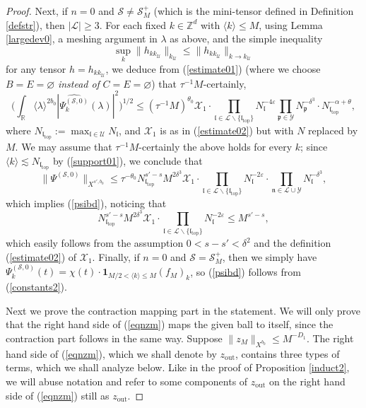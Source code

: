 \documentclass[11 pt,reqno]{amsart}
\theoremstyle{definition}
\theoremstyle{remark}
\numberwithin{equation}{section}
\newcommand{\Sc}{\mathcal{S}}
\newcommand{\Lc}{\mathcal{L}}
\newcommand{\Uc}{\mathcal{U}}
\newcommand{\Xc}{\mathcal{X}}
\newcommand{\Yc}{\mathcal{Y}}
\newcommand{\Rb}{\mathbb{R}}
\newcommand{\Zb}{\mathbb{Z}}
\newcommand{\pf}{\mathfrak{p}}
\newcommand{\nf}{\mathfrak{n}}
\newcommand{\lf}{\mathfrak{l}}
\begin{document}
{\begin{proof}
Next, if $n=0$ and $\Sc\neq\Sc_M^+$ (which is the mini-tensor defined in Definition \ref{defstr}), then $|\Lc|\geq 3$. For each fixed $k\in\Zb^d$ with $\langle k\rangle \leq M$, using Lemma \ref{largedev0}, a meshing argument in $\lambda$ as above, and the simple inequality
\[\sup_k\|h_{kk_\Uc}\|_{k_\Uc}\leq\|h_{kk_\Uc}\|_{k\to k_\Uc}\] for any tensor $h=h_{kk_\Uc}$, we deduce from (\ref{estimate01}) (where we choose $B=E=\varnothing$ \emph{instead of} $C=E=\varnothing$) that $\tau^{-1}M$-certainly,
\[\bigg(\int_{\Rb}\langle\lambda\rangle^{2b_0}|\widehat{\Psi_k^{(\Sc,0)}}(\lambda)|^2\bigg)^{1/2}\leq(\tau^{-1}M)^{\theta_0}\Xc_1\cdot\prod_{\lf\in\Lc\backslash\{\lf_{\mathrm{top}}\}}N_\lf^{-4\varepsilon}\prod_{\pf\in\Yc}N_\pf^{-\delta^3}\cdot N_{\lf_{\mathrm{top}}}^{-\alpha+\theta},\] where $N_{\lf_{\mathrm{top}}}:=\max_{\lf\in\Uc}N_\lf$, and $\Xc_1$ is as in (\ref{estimate02}) but with $N$ replaced by $M$. We may assume that $\tau^{-1}M$-certainly the above holds for every $k$; since $\langle k\rangle\lesssim N_{\lf_{\mathrm{top}}}$ by (\ref{support01}), we conclude that
\[\|\Psi^{(\Sc,0)}\|_{X^{s',b_0}}\leq\tau^{-\theta_0}N_{\lf_{\mathrm{top}}}^{s'-s}M^{2\delta^3}\Xc_1\cdot\prod_{\lf\in\Lc\backslash\{\lf_{\mathrm{top}}\}}N_\lf^{-2\varepsilon}\cdot\prod_{\nf\in\Lc\cup\Yc}N_{\lf}^{-\delta^3},\] which implies (\ref{psibd}), noticing that
\[N_{\lf_{\mathrm{top}}}^{s'-s}M^{2\delta^3}\Xc_1\cdot\prod_{\lf\in\Lc\backslash\{\lf_{\mathrm{top}}\}}N_\lf^{-2\varepsilon}\leq M^{s'-s},\] which easily follows from the assumption $0<s-s'<\delta^2$ and the definition (\ref{estimate02}) of $\Xc_1$. Finally, if $n=0$ and $\Sc=\Sc_M^+$, then we simply have $\Psi_k^{(\Sc,0)}(t)=\chi(t)\cdot\mathbf{1}_{M/2<\langle k\rangle\leq M}(f_M)_k$, so (\ref{psibd}) follows from (\ref{constants2}).

Next we prove the contraction mapping part in the statement. We will only prove that the right hand side of (\ref{eqnzm}) maps the given ball to itself, since the contraction part follows in the same way. Suppose $\|z_M\|_{X^{b_0}}\leq M^{-D_1}$. The right hand side of (\ref{eqnzm}), which we shall denote by $z_{\mathrm{out}}$, contains three types of terms, which we shall analyze below. Like in the proof of Proposition \ref{induct2}, we will abuse notation and refer to some components of $z_{\mathrm{out}}$ on the right hand side of (\ref{eqnzm}) still as $z_{\mathrm{out}}$.


\end{proof}}
\end{document}
